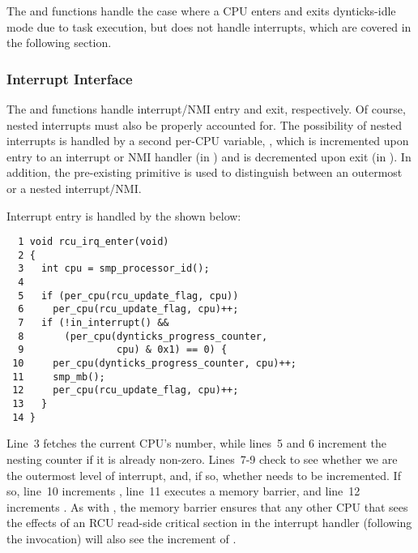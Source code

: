 The  and 
functions handle the case where a CPU enters and exits dynticks-idle
mode due to task execution, but does not handle interrupts, which are
covered in the following section.

\subsubsection{Interrupt Interface}
\label{app:formal:Interrupt Interface}

The  and 
functions handle interrupt/NMI entry and exit, respectively.
Of course, nested interrupts must also be properly accounted for.
The possibility of nested interrupts is handled by a second per-CPU
variable, , which is incremented upon
entry to an interrupt or NMI handler (in )
and is decremented upon exit (in ).
In addition, the pre-existing  primitive is
used to distinguish between an outermost or a nested interrupt/NMI.

Interrupt entry is handled by the 
shown below:

{ \scriptsize
\begin{verbatim}
  1 void rcu_irq_enter(void)
  2 {
  3   int cpu = smp_processor_id();
  4
  5   if (per_cpu(rcu_update_flag, cpu))
  6     per_cpu(rcu_update_flag, cpu)++;
  7   if (!in_interrupt() &&
  8       (per_cpu(dynticks_progress_counter,
  9                cpu) & 0x1) == 0) {
 10     per_cpu(dynticks_progress_counter, cpu)++;
 11     smp_mb();
 12     per_cpu(rcu_update_flag, cpu)++;
 13   }
 14 }
\end{verbatim}
}

Line~3 fetches the current CPU's number, while lines~5 and 6
increment the  nesting counter if it
is already non-zero.
Lines~7-9 check to see whether we are the outermost level of
interrupt, and, if so, whether 
needs to be incremented.
If so, line~10 increments ,
line~11 executes a memory barrier, and line~12 increments
.
As with , the memory barrier ensures that
any other CPU that sees the effects of an RCU read-side critical section
in the interrupt handler (following the 
invocation) will also see the increment of
.

